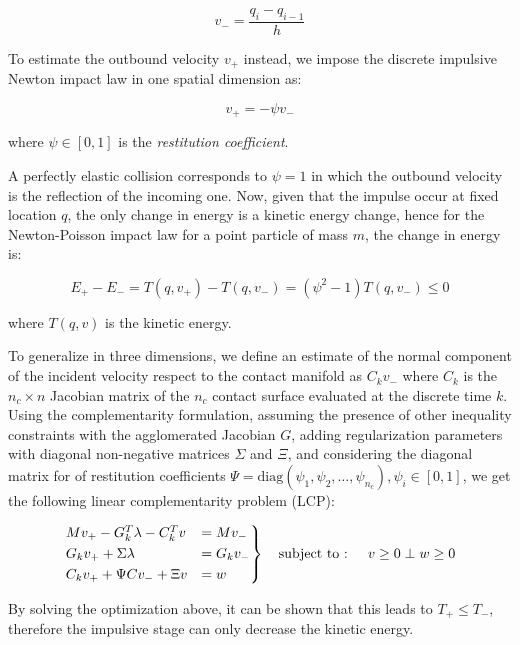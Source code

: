 \begin{equation}
    v _{-} = \frac{q _i - q _{i-1}}{h}
\end{equation}

To estimate the outbound velocity $v _{+}$ instead, we impose the discrete impulsive Newton impact law in one spatial dimension as:

\begin{equation}
    v _{+} = -\psi v _{-}
\end{equation}

where $\psi \in [0,1]$ is the \textit{restitution coefficient}.

A perfectly elastic collision corresponds to $\psi = 1$ in which the outbound velocity is the reflection of the incoming one. Now, given that the impulse occur at fixed location $q$, the only change in energy is a kinetic energy change, hence for the Newton-Poisson impact law for a point particle of mass $m$, the change in energy is:

\begin{equation}
    E _{+} - E _{-} = T(q, v _{+}) - T(q, v _{-}) = (\psi ^2 - 1) T(q, v _{-}) \leq 0
\end{equation}

where $T(q, v)$ is the kinetic energy.

To generalize in three dimensions, we define an estimate of the normal component of the incident velocity respect to the contact manifold as $C _k v _{-}$ where $C _k$ is the $n _c \times n$ Jacobian matrix of the $n _c$ contact surface evaluated at the discrete time $k$. Using the complementarity formulation, assuming the presence of other inequality constraints with the agglomerated Jacobian $G$, adding regularization parameters with diagonal non-negative matrices $\Sigma$ and $\Xi$, and considering the diagonal matrix for of restitution coefficients $\Psi = \text{diag}(\psi _1, \psi _2, \dots, \psi _{n _c}),  \psi _i \in [0, 1]$, we get the following linear complementarity problem (LCP):

\begin{equation}
    \begin{rcases}
        Mv _{+} - G ^T _k \lambda - C ^T _k v & = M v _{-}    \\
        G _k v _{+} + \Sigma \lambda          & = G _k v _{-} \\
        C _k v _{+} + \Psi C v _{-} + \Xi v   & = w           \\
    \end{rcases} \quad \text{subject to
        :  } \quad v \geq 0 \perp w \geq 0
\end{equation}

By solving the optimization above, it can be shown that this leads to $T _{+} \leq T _{-}$, therefore the impulsive stage can only decrease the kinetic energy.